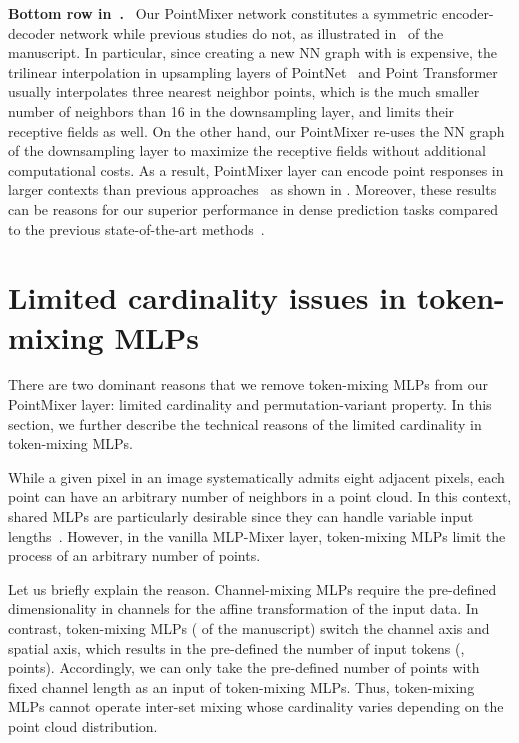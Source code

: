 \noindent \textbf{Bottom row in~.} \ 
Our PointMixer network constitutes a symmetric encoder-decoder network while previous studies do not, as illustrated in~ of the manuscript.
In particular, since creating a new NN graph with  is expensive, the trilinear interpolation in upsampling layers of PointNet\plusplus~\cite{pointnet++} and Point Transformer~\cite{point-transformer} usually interpolates three nearest neighbor points, which is the much smaller number of neighbors than 16 in the downsampling layer, and limits their receptive fields as well.
On the other hand, our PointMixer re-uses the NN graph of the downsampling layer to maximize the receptive fields without additional computational costs.
As a result, PointMixer layer can encode point responses in larger contexts than previous approaches~\cite{pointnet++,point-transformer} as shown in .
Moreover, these results can be reasons for our superior performance in dense prediction tasks compared to the previous state-of-the-art methods~\cite{point-transformer,point-recon}.




 
\section{Limited cardinality issues in token-mixing MLPs}
\label{sec:tokenMLPs}
There are two dominant reasons that we remove token-mixing MLPs from our PointMixer layer: limited cardinality and permutation-variant property.
In this section, we further describe the technical reasons of the limited cardinality in token-mixing MLPs.

While a given pixel in an image systematically admits eight adjacent pixels, each point can have an arbitrary number of neighbors in a point cloud. In this context, shared MLPs are particularly desirable since they can handle variable input lengths~\cite{res-mlp}. However, in the vanilla MLP-Mixer layer, token-mixing MLPs limit the process of an arbitrary number of points.

Let us briefly explain the reason. Channel-mixing MLPs require the pre-defined dimensionality in channels for the affine transformation of the input data. 
In contrast, token-mixing MLPs (\Eref{eq:mix_spatial} of the manuscript) switch the channel axis and spatial axis, which results in the pre-defined the number of input tokens (\eg, points). Accordingly, we can only take the pre-defined number of points with fixed channel length as an input of token-mixing MLPs. Thus, token-mixing MLPs cannot operate inter-set mixing whose cardinality varies depending on the point cloud distribution. 
